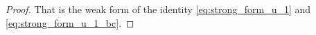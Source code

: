 \documentclass[11pt]{article}
\def\p{\partial}
\newcommand{\di}[1]{\,\mathrm{d}#1}
\begin{document}
\begin{proof}
That is the weak form of the identity \eqref{eq:strong_form_u_1} and \eqref{eq:strong_form_u_1_bc}. 


\end{proof}
\end{document}
